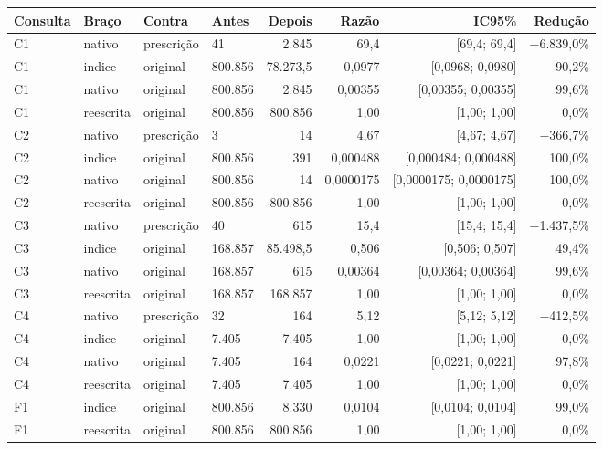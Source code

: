 {\footnotesize\setlength{\tabcolsep}{4pt}
\begin{tabular}{llllrrrr}
\toprule
Consulta & Braço & Contra & Antes & Depois & Razão & IC95\% & Redução \\
\midrule
C1 & nativo & prescrição & 41 & 2.845 & 69,4 & [69,4; 69,4] & $-$6.839,0\% \\
C1 & indice & original & 800.856 & 78.273,5 & 0,0977 & [0,0968; 0,0980] & 90,2\% \\
C1 & nativo & original & 800.856 & 2.845 & 0,00355 & [0,00355; 0,00355] & 99,6\% \\
C1 & reescrita & original & 800.856 & 800.856 & 1,00 & [1,00; 1,00] & 0,0\% \\
C2 & nativo & prescrição & 3 & 14 & 4,67 & [4,67; 4,67] & $-$366,7\% \\
C2 & indice & original & 800.856 & 391 & 0,000488 & [0,000484; 0,000488] & 100,0\% \\
C2 & nativo & original & 800.856 & 14 & 0,0000175 & [0,0000175; 0,0000175] & 100,0\% \\
C2 & reescrita & original & 800.856 & 800.856 & 1,00 & [1,00; 1,00] & 0,0\% \\
C3 & nativo & prescrição & 40 & 615 & 15,4 & [15,4; 15,4] & $-$1.437,5\% \\
C3 & indice & original & 168.857 & 85.498,5 & 0,506 & [0,506; 0,507] & 49,4\% \\
C3 & nativo & original & 168.857 & 615 & 0,00364 & [0,00364; 0,00364] & 99,6\% \\
C3 & reescrita & original & 168.857 & 168.857 & 1,00 & [1,00; 1,00] & 0,0\% \\
C4 & nativo & prescrição & 32 & 164 & 5,12 & [5,12; 5,12] & $-$412,5\% \\
C4 & indice & original & 7.405 & 7.405 & 1,00 & [1,00; 1,00] & 0,0\% \\
C4 & nativo & original & 7.405 & 164 & 0,0221 & [0,0221; 0,0221] & 97,8\% \\
C4 & reescrita & original & 7.405 & 7.405 & 1,00 & [1,00; 1,00] & 0,0\% \\
F1 & indice & original & 800.856 & 8.330 & 0,0104 & [0,0104; 0,0104] & 99,0\% \\
F1 & reescrita & original & 800.856 & 800.856 & 1,00 & [1,00; 1,00] & 0,0\% \\

\end{tabular}}
